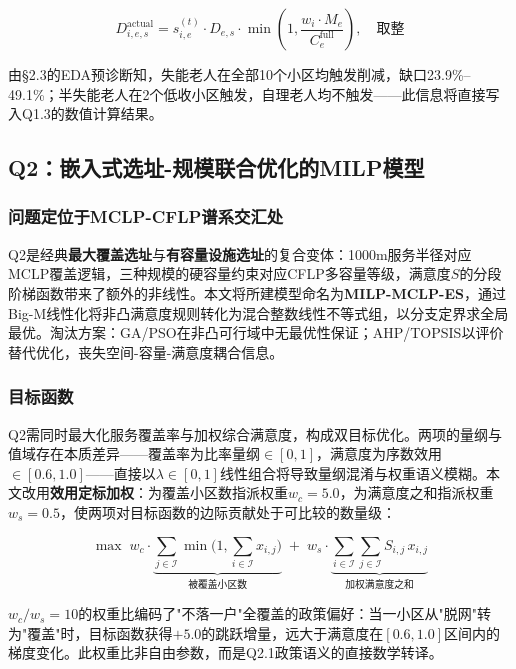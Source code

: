 \begin{equation}
D_{i,e,s}^{\text{actual}} = s_{i,e}^{(t)} \cdot D_{e,s} \cdot \min\left(1, \frac{w_i \cdot M_e}{C_e^{\text{full}}}\right), \quad \text{取整}
\end{equation}

由§2.3的EDA预诊断知，失能老人在全部10个小区均触发削减，缺口23.9\%--49.1\%；半失能老人在2个低收小区触发，自理老人均不触发——此信息将直接写入Q1.3的数值计算结果。

\subsection{Q2：嵌入式选址-规模联合优化的MILP模型}

\subsubsection{问题定位于MCLP-CFLP谱系交汇处}

Q2是经典\textbf{最大覆盖选址}与\textbf{有容量设施选址}的复合变体：1000m服务半径对应MCLP覆盖逻辑\cite{church1974}，三种规模的硬容量约束对应CFLP多容量等级\cite{daskin1995}，满意度$S$的分段阶梯函数带来了额外的非线性。本文将所建模型命名为\textbf{MILP-MCLP-ES}，通过Big-M线性化将非凸满意度规则转化为混合整数线性不等式组，以分支定界求全局最优。淘汰方案：GA/PSO在非凸可行域中无最优性保证；AHP/TOPSIS以评价替代优化，丧失空间-容量-满意度耦合信息。

\subsubsection{目标函数}

Q2需同时最大化服务覆盖率与加权综合满意度，构成双目标优化。两项的量纲与值域存在本质差异——覆盖率为比率量纲$\in[0,1]$，满意度为序数效用$\in[0.6,1.0]$——直接以$\lambda\in[0,1]$线性组合将导致量纲混淆与权重语义模糊。本文改用\textbf{效用定标加权}：为覆盖小区数指派权重$w_c=5.0$，为满意度之和指派权重$w_s=0.5$，使两项对目标函数的边际贡献处于可比较的数量级：

\begin{equation}
\max \; w_c \cdot \underbrace{\sum_{j\in\mathcal{I}} \min\!\big(1,\sum_{i\in\mathcal{I}}x_{i,j}\big)}_{\text{被覆盖小区数}} \;+\; w_s \cdot \underbrace{\sum_{i\in\mathcal{I}}\sum_{j\in\mathcal{I}} S_{i,j}\,x_{i,j}}_{\text{加权满意度之和}}
\end{equation}

$w_c/w_s=10$的权重比编码了"不落一户"全覆盖的政策偏好：当一小区从"脱网"转为"覆盖"时，目标函数获得$+5.0$的跳跃增量，远大于满意度在$[0.6,1.0]$区间内的梯度变化。此权重比非自由参数，而是Q2.1政策语义的直接数学转译。

